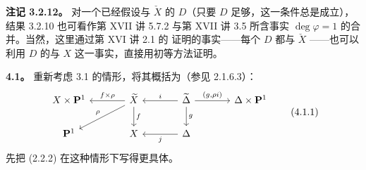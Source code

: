 \textbf{注记 3.2.12。} 对一个已经假设与 $\check X$ 的  $D$（只要 $D$ 足够，这一条件总是成立），结果 3.2.10 也可看作第 XVII 讲 5.7.2 与第 XVII 讲 3.5 所含事实 $\deg\varphi=1$ 的合并。当然，这里通过第 XVI 讲 2.1 的 证明的事实——每个  $D$ 都与 $\check X$ ——也可以利用 $D$ 的与 $X$ 这一事实，直接用初等方法证明。

\textbf{4.1。} 重新考虑 3.1 的情形，将其概括为（参见 2.1.6.3）：
\[
\begin{tikzcd}[column sep=large]
X\times\mathbf P^1&\widetilde X\arrow[l,"f\times\rho"']\arrow[d,"f"]\arrow[dl,"\rho"']&\widetilde\Delta\arrow[l,"i"']\arrow[d,"g"]\arrow[r,"{(g,\rho i)}"]&\Delta\times\mathbf P^1\\
\mathbf P^1&X&\Delta\arrow[l,"j"]&
\end{tikzcd}\tag{4.1.1}
\]
先把 (2.2.2) 在这种情形下写得更具体。

